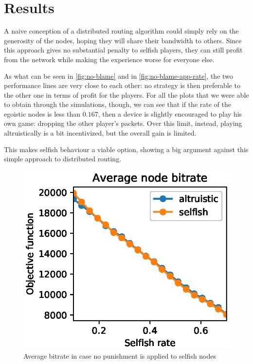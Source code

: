 \documentclass[conference,10.5pt]{IEEEtran}
\begin{document}
\section{Results} \label{sec:results}


A naive conception of a distributed routing algorithm could simply rely on the generosity of the nodes, hoping they will share their bandwidth to others.
Since this approach gives no substantial penalty to selfish players, they can still profit from the network while making the experience worse for everyone else.

As what can be seen in \autoref{fig:no-blame} and in \autoref{fig:no-blame-app-rate}, the two performance lines are very close to each other: no strategy is then  preferable to the other one in terms of profit for the players. For all the plots that we were able to obtain through the simulations, though, we can see that if the rate of the egoistic nodes is less than $0.167$, then a device is slightly encouraged to play his own game: dropping the other player's packets.
Over this limit, instead, playing altruistically is a bit incentivized, but the overall gain is limited.

This makes selfish behaviour a viable option, showing a big argument against this simple approach to distributed routing.

\begin{figure}[h]
  \includegraphics{figures/obj_func_vs_selfish_rate_no_punish.eps}
  \caption{Average bitrate in case no punishment is applied to selfish nodes}
  \label{fig:no-blame}
\end{figure}
\end{document}
